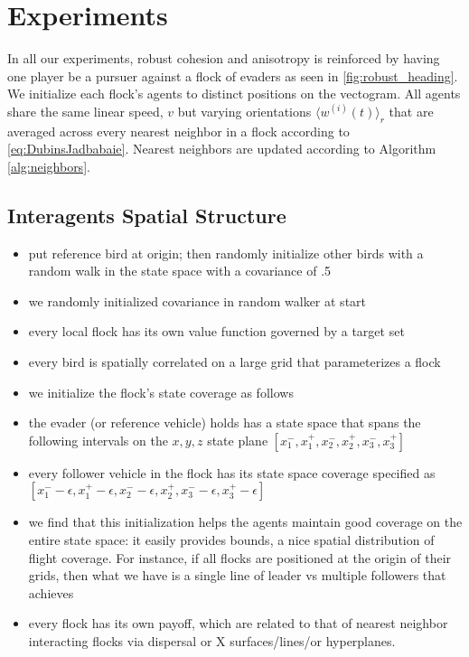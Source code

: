 \section{Experiments}
\label{sec:expts}
%
In all our experiments, robust cohesion and anisotropy is reinforced by having one player be a pursuer against a flock of evaders as seen in \autoref{fig:robust_heading}. We initialize each flock's agents to distinct positions on the vectogram. All agents share the same linear speed, $v$ but varying orientations $\langle w^{(i)} (t) \rangle_r$ that are averaged across every nearest neighbor in a flock according to \eqref{eq:DubinsJadbabaie}. Nearest neighbors are updated according to Algorithm \ref{alg:neighbors}.
%


\subsection{Interagents Spatial Structure}

\begin{itemize}
	\item put reference bird at origin; then randomly initialize other birds with a random walk in the state space with a covariance of .5~\cite{LekanCASE2016Paper}
	\item we randomly initialized covariance in random walker at start
	\item every local flock has its own value function governed by a target set
	\item every bird is spatially correlated on a large grid that parameterizes a flock
\end{itemize}
%
\begin{itemize}
	\item we initialize the flock's state coverage as follows
	\item the evader (or reference vehicle) holds has a state space that spans the following intervals on the $x,y,z$ state plane
	$[x_1^-, x_1^+, x_2^-, x_2^+, x_3^-, x_3^+]$
	\item every follower vehicle in the flock has its state space coverage specified as
	$[x_1^- -\epsilon, x_1^+ - \epsilon, x_2^- -\epsilon, x_2^+, x_3^- -\epsilon, x_3^+ - \epsilon]$
	\item we find that this initialization helps the agents maintain good coverage on the entire state space: it easily provides bounds, a nice spatial distribution of flight coverage. For instance, if all flocks are positioned at the origin of their grids, then what we have is a single line of leader vs multiple followers that achieves
	\item every flock has its own payoff, which are related to that of nearest neighbor interacting flocks via dispersal or X surfaces/lines/or hyperplanes.
\end{itemize}


